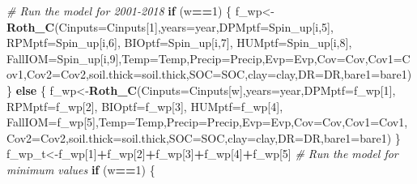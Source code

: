 \documentclass[
  10pt,
  b5paper,
]{book}
\newenvironment{Shaded}{\begin{snugshade}}{\end{snugshade}}
\newcommand{\CommentTok}[1]{\textcolor[rgb]{0.56,0.35,0.01}{\textit{#1}}}
\newcommand{\ControlFlowTok}[1]{\textcolor[rgb]{0.13,0.29,0.53}{\textbf{#1}}}
\newcommand{\DataTypeTok}[1]{\textcolor[rgb]{0.13,0.29,0.53}{#1}}
\newcommand{\DecValTok}[1]{\textcolor[rgb]{0.00,0.00,0.81}{#1}}
\newcommand{\KeywordTok}[1]{\textcolor[rgb]{0.13,0.29,0.53}{\textbf{#1}}}
\newcommand{\NormalTok}[1]{#1}
\newcommand{\OperatorTok}[1]{\textcolor[rgb]{0.81,0.36,0.00}{\textbf{#1}}}
\begin{document}
\begin{Shaded}
\begin{Highlighting}[]
\CommentTok{# Run the model for 2001-2018 }
\ControlFlowTok{if}\NormalTok{ (w}\OperatorTok{==}\DecValTok{1}\NormalTok{) \{}
\NormalTok{f_wp<-}\KeywordTok{Roth_C}\NormalTok{(}\DataTypeTok{Cinputs=}\NormalTok{Cinputs[}\DecValTok{1}\NormalTok{],}\DataTypeTok{years=}\NormalTok{year,}\DataTypeTok{DPMptf=}\NormalTok{Spin_up[i,}\DecValTok{5}\NormalTok{], }\DataTypeTok{RPMptf=}\NormalTok{Spin_up[i,}\DecValTok{6}\NormalTok{], }\DataTypeTok{BIOptf=}\NormalTok{Spin_up[i,}\DecValTok{7}\NormalTok{], }\DataTypeTok{HUMptf=}\NormalTok{Spin_up[i,}\DecValTok{8}\NormalTok{], }\DataTypeTok{FallIOM=}\NormalTok{Spin_up[i,}\DecValTok{9}\NormalTok{],}\DataTypeTok{Temp=}\NormalTok{Temp,}\DataTypeTok{Precip=}\NormalTok{Precip,}\DataTypeTok{Evp=}\NormalTok{Evp,}\DataTypeTok{Cov=}\NormalTok{Cov,}\DataTypeTok{Cov1=}\NormalTok{Cov1,}\DataTypeTok{Cov2=}\NormalTok{Cov2,}\DataTypeTok{soil.thick=}\NormalTok{soil.thick,}\DataTypeTok{SOC=}\NormalTok{SOC,}\DataTypeTok{clay=}\NormalTok{clay,}\DataTypeTok{DR=}\NormalTok{DR,}\DataTypeTok{bare1=}\NormalTok{bare1)}
\NormalTok{\} }\ControlFlowTok{else}\NormalTok{ \{}
\NormalTok{f_wp<-}\KeywordTok{Roth_C}\NormalTok{(}\DataTypeTok{Cinputs=}\NormalTok{Cinputs[w],}\DataTypeTok{years=}\NormalTok{year,}\DataTypeTok{DPMptf=}\NormalTok{f_wp[}\DecValTok{1}\NormalTok{], }\DataTypeTok{RPMptf=}\NormalTok{f_wp[}\DecValTok{2}\NormalTok{], }\DataTypeTok{BIOptf=}\NormalTok{f_wp[}\DecValTok{3}\NormalTok{], }\DataTypeTok{HUMptf=}\NormalTok{f_wp[}\DecValTok{4}\NormalTok{], }\DataTypeTok{FallIOM=}\NormalTok{f_wp[}\DecValTok{5}\NormalTok{],}\DataTypeTok{Temp=}\NormalTok{Temp,}\DataTypeTok{Precip=}\NormalTok{Precip,}\DataTypeTok{Evp=}\NormalTok{Evp,}\DataTypeTok{Cov=}\NormalTok{Cov,}\DataTypeTok{Cov1=}\NormalTok{Cov1,}\DataTypeTok{Cov2=}\NormalTok{Cov2,}\DataTypeTok{soil.thick=}\NormalTok{soil.thick,}\DataTypeTok{SOC=}\NormalTok{SOC,}\DataTypeTok{clay=}\NormalTok{clay,}\DataTypeTok{DR=}\NormalTok{DR,}\DataTypeTok{bare1=}\NormalTok{bare1)}
\NormalTok{\}}
\NormalTok{f_wp_t<-f_wp[}\DecValTok{1}\NormalTok{]}\OperatorTok{+}\NormalTok{f_wp[}\DecValTok{2}\NormalTok{]}\OperatorTok{+}\NormalTok{f_wp[}\DecValTok{3}\NormalTok{]}\OperatorTok{+}\NormalTok{f_wp[}\DecValTok{4}\NormalTok{]}\OperatorTok{+}\NormalTok{f_wp[}\DecValTok{5}\NormalTok{]}
\CommentTok{# Run the model for minimum values}
\ControlFlowTok{if}\NormalTok{ (w}\OperatorTok{==}\DecValTok{1}\NormalTok{) \{}

\end{Highlighting}
\end{Shaded}
\end{document}
